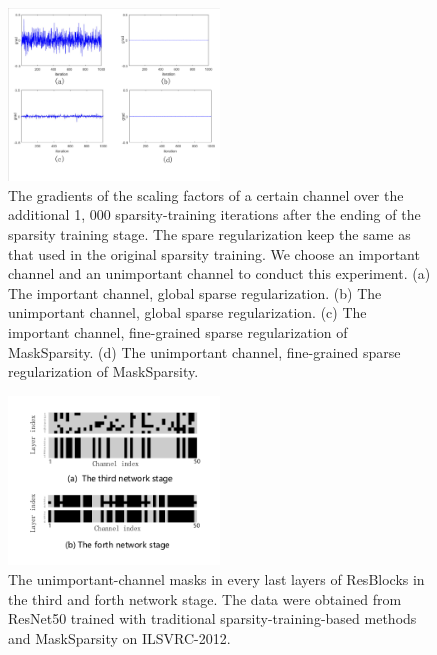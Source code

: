 \documentclass[review]{cvpr}
\begin{document}
\begin{figure}[h!]
	\begin{centering}
		\includegraphics[width=0.5\textwidth]{figure/grad2_cropped.pdf}
		\caption{The gradients of the scaling factors of a certain channel over the additional 1, 000 sparsity-training iterations after the ending of the sparsity training stage. The spare regularization keep the same as that used in the original sparsity training. We choose an important channel and an unimportant channel to conduct this experiment. (a) The important channel, global sparse regularization. (b) The unimportant channel, global sparse regularization. (c) The important channel, fine-grained sparse regularization of MaskSparsity. (d) The unimportant channel, fine-grained sparse regularization of MaskSparsity.}
		\label{grad}
		\par\end{centering}
\end{figure}

 
\begin{figure}[h!]
	\begin{centering}
		\includegraphics[width=0.5\textwidth]{figure/stage_mask_ablationstudy.pdf} 
	    \caption{ The unimportant-channel masks in every last layers of ResBlocks in the third and forth network stage.	The data were obtained from ResNet50 trained with traditional sparsity-training-based methods and MaskSparsity on ILSVRC-2012.
    	}
        \label{Pruning-mask-exp}
    \par\end{centering}
\end{figure}
\end{document}
